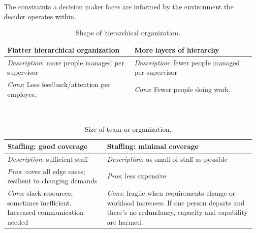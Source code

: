 The constraints a decision maker faces are informed by the environment the decider operates within. 

\begin{center}
\begin{table}[ht]
\begin{tabular}{ | m{\dilemmatablewidth}| m{\dilemmatablewidth} | } 
  \hline
  \textbf{Flatter hierarchical organization} &
  \textbf{More layers of hierarchy} \\ 
  \hline
  \textit{Description}: more people managed per supervisor & 
  \textit{Description}: fewer people managed per supervisor \\ 
  \hline
  \textit{Cons}: Less feedback/attention per employee. & 
  \textit{Cons}: Fewer people doing work. \\  
  \hline
\end{tabular}
\caption{Shape of hierarchical organization.
}
\end{table}
\end{center}

\ \\

\begin{center}
\begin{table}[ht]
\begin{tabular}{ | m{\dilemmatablewidth}| m{\dilemmatablewidth} | } 
  \hline
  \textbf{Staffing: good coverage} &
  \textbf{Staffing: minimal coverage} \\
  \hline
  \textit{Description}: sufficient staff &
  \textit{Description}: as small of staff as possible \\  
  \hline
  \textit{Pros}: cover all edge cases; resilient to changing demands &
  \textit{Pros}: less expensive \\
  \hline
  \textit{Cons}: slack resources; sometimes inefficient. Increased communication needed & 
  \textit{Cons}: fragile when requirements change or workload increases. If one person departs and there's no redundancy, capacity and capability are harmed.  \\
  \hline
\end{tabular}
\caption{Size of team or organization.
}
\label{table:staff_many-vs-few}
\end{table}
\end{center}


\ \\

